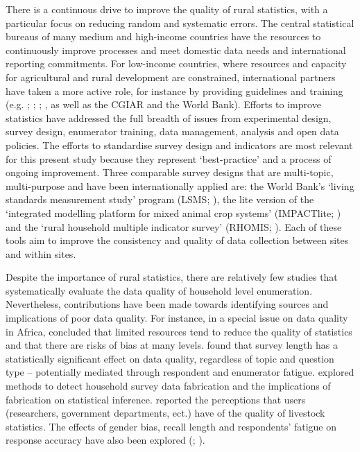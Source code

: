 There is a continuous drive to improve the quality of rural statistics, with a particular focus on reducing random and systematic errors. The central statistical bureaus of many medium and high-income countries have the resources to continuously improve processes and meet domestic data needs and international reporting commitments. For low-income countries, where resources and capacity for agricultural and rural development are constrained, international partners have taken a more active role, for instance by providing guidelines and training (e.g. \citealp{FAO2017}; \citealp{UNFCCC2012}; \citealp{OECD2009}; \citealp{UnitedNationsDepartmentofEconomicandSocialAffairs2005}, as well as the CGIAR and the World Bank). Efforts to improve statistics have addressed the full breadth of issues from experimental design, survey design, enumerator training, data management, analysis and open data policies. The efforts to standardise survey design and indicators are most relevant for this present study because they represent `best-practice' and a process of ongoing improvement. Three comparable survey designs that are multi-topic, multi-purpose and have been internationally applied are: the World Bank's `living standards measurement study' program (LSMS; \citealp{WorldBanka}), the lite version of the `integrated modelling platform for mixed animal crop systems' (IMPACTlite; \citealp{Herrero2007}) and the `rural household multiple indicator survey' (RHOMIS; \citealp{Hammond2017225}). Each of these tools aim to improve the consistency and quality of data collection between sites and within sites.

Despite the importance of rural statistics, there are relatively few studies that systematically evaluate the data quality of household level enumeration. Nevertheless, contributions have been made towards identifying sources and implications of poor data quality. For instance, in a special issue on data quality in Africa, \citet{Jerven2015} concluded that limited resources tend to reduce the quality of statistics and that there are risks of bias at many levels. \citet{Kilic2015} found that survey length has a statistically significant effect on data quality, regardless of topic and question type -- potentially mediated through respondent and enumerator fatigue. \citet{Finn2017} explored methods to detect household survey data fabrication and the implications of fabrication on statistical inference. \citet{Pica-ciamarra2012} reported the perceptions that users (researchers, government departments, ect.) have of the quality of livestock statistics. The effects of gender bias, recall length and respondents' fatigue on response accuracy have also been explored (\citealp{DeNicola2014}; \citealp{Beegle2012}).

